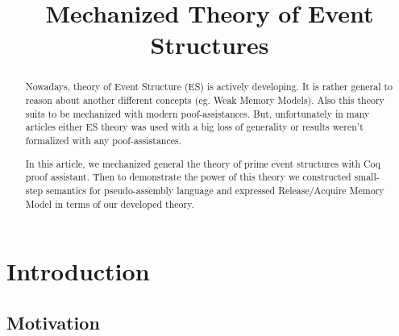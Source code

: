 \documentclass[conference]{IEEEtran}
\begin{document}
\title{Mechanized Theory of Event Structures}

\author{
\and
{}
\and
{}
\and
{}
}

\maketitle

\begin{abstract}


Nowadays, theory of Event Structure (ES) is actively developing. It is rather general to reason about another different  concepts (eg. Weak Memory Models). Also this theory suits to be mechanized with modern poof-assistances. But, unfortunately in many articles either ES theory was used with a big loss of generality or results weren't formalized with any poof-assistances.

In this article, we mechanized general the theory of prime event structures with Coq proof assistant. Then to demonstrate the power of this theory we constructed small-step semantics for pseudo-assembly language and expressed Release/Acquire Memory Model in terms of our developed theory.
\end{abstract}

\IEEEpeerreviewmaketitle

\section{Introduction}

\subsection{Motivation}


\end{document}
